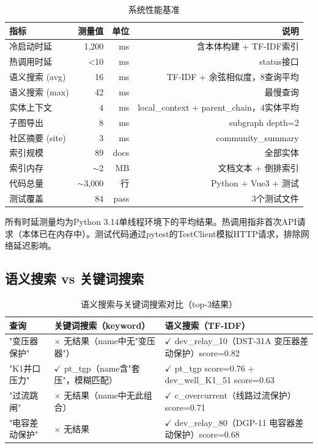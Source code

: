 \documentclass[12pt,a4paper]{article}
\begin{document}
\begin{table}[H]
\centering
\caption{系统性能基准}
\label{tab:performance}
\begin{tabular}{@{}lrrr@{}}
\toprule
\textbf{指标} & \textbf{测量值} & \textbf{单位} & \textbf{说明} \\
\midrule
冷启动时延 & 1,200 & ms & 含本体构建 + TF-IDF索引 \\
热调用时延 & <10 & ms & status接口 \\
语义搜索 (avg) & 16 & ms & TF-IDF + 余弦相似度，8查询平均 \\
语义搜索 (max) & 42 & ms & 最慢查询 \\
实体上下文 & 4 & ms & local\_context + parent\_chain，4实体平均 \\
子图导出 & 8 & ms & subgraph depth=2 \\
社区摘要 (site) & 3 & ms & community\_summary \\
索引规模 & 89 & docs & 全部实体 \\
索引内存 & $\sim$2 & MB & 文档文本 + 倒排索引 \\
代码总量 & $\sim$3,000 & 行 & Python + Vue3 + 测试 \\
测试覆盖 & 84 & pass & 3个测试文件 \\
\bottomrule
\end{tabular}
\end{table}

所有时延测量均为Python 3.14单线程环境下的平均结果。热调用指非首次API请求（本体已在内存中）。测试代码通过pytest的TestClient模拟HTTP请求，排除网络延迟影响。

\subsection{语义搜索 vs 关键词搜索}

\begin{table}[H]
\centering
\caption{语义搜索与关键词搜索对比（top-3结果）}
\label{tab:search-compare}
\begin{tabular}{@{}p{3cm}p{3.5cm}p{3.5cm}@{}}
\toprule
\textbf{查询} & \textbf{关键词搜索（keyword）} & \textbf{语义搜索（TF-IDF）} \\
\midrule
"变压器保护" & $\times$ 无结果（name中无"变压器"） & $\checkmark$ dev\_relay\_10（DST-31A 变压器差动保护）score=0.82 \\
"K1井口压力" & $\checkmark$ pt\_tgp（name含"套压"，模糊匹配） & $\checkmark$ pt\_tgp score=0.76 + dev\_well\_K1\_51 score=0.63 \\
"过流跳闸" & $\times$ 无结果（name中无此组合） & $\checkmark$ c\_overcurrent（线路过流保护）score=0.71 \\
"电容差动保护" & $\times$ 无结果 & $\checkmark$ dev\_relay\_80（DGP-11 电容器差动保护）score=0.68 \\
\bottomrule
\end{tabular}
\end{table}
\end{document}
